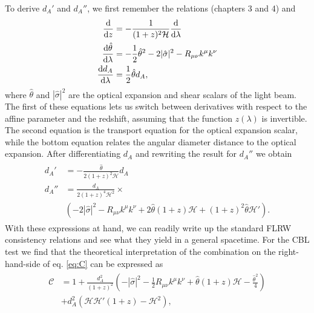 \documentclass[reprint,aps,prd,nofootinbib,a4paper,10pt,twocolumn,superscriptaddress]{revtex4-2}
\begin{document}
\newline\newline
To derive $d_A'$ and $d_A''$, we first remember the relations \cite{Schneider1992} (chapters 3 and 4) and \cite{godbog}
\begin{align}
    \begin{split}
        \frac{\rm d}{{\rm d} z} & = -\frac{1}{(1+z)^2\mathcal{H}}\frac{{\rm d}}{ {\rm d} \lambda}\\
        \frac{{\rm d} \hat\theta}{ {\rm d} \lambda} &= -\frac{1}{2}\hat\theta^2 - 2|\hat\sigma|^2-R_{\mu\nu}k^\mu k^\nu\\
        \frac{{\rm d} d_A}{{\rm d} \lambda}& = \frac{1}{2}\hat\theta d_A,
    \end{split}
\end{align}
where $\hat\theta$ and $|\hat\sigma|^2$ are the optical expansion and shear scalars of the light beam. The first of these equations lets us switch between derivatives with respect to the affine parameter and the redshift, assuming that the function $z(\lambda)$ is invertible. The second equation is the transport equation for the optical expansion scalar, while the bottom equation relates the angular diameter distance to the optical expansion.
\newline\indent
After differentiating $d_A$ and rewriting the result for $d_A''$ we obtain
\begin{align}\label{eq:dadaprime}
\begin{split}
    d_A' &= -\frac{\hat \theta}{2(1+z)^2\mathcal{H}}d_A\\
    d_A''  & =\frac{d_A}{2(1+z)^4\mathcal{H}^2}\times \\& \left( -2|\hat\sigma|^2 - R_{\mu\nu}k^\mu k^\nu + 2\hat\theta(1+z)\mathcal{H}+ (1+z)^2\hat\theta\mathcal{H}'  \right).
\end{split}
\end{align}
With these expressions at hand, we can readily write up the standard FLRW consistency relations and see what they yield in a general spacetime. For the CBL test we find that the theoretical interpretation of the combination on the right-hand-side of eq. \ref{eq:C} can be expressed as
\begin{align}\label{eq:Cderived}
    \begin{split}
    \mathcal{C}&= 1+ \frac{d_A^2}{(1+z)^2}\left(-|\hat\sigma|^2-\frac{1}{2}R_{\mu\nu}k^\mu k^\nu + \hat\theta(1+z)\mathcal{H}-\frac{\hat\theta^2}{4}\right)\\& + d_A^2\left( \mathcal{H}\mathcal{H}'(1+z)-\mathcal{H}^2 \right) ,
    \end{split}
\end{align}
\end{document}

